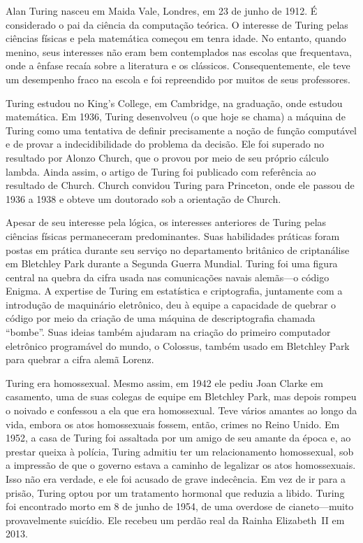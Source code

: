 \documentclass[../../../include/open-logic-section]{subfiles}
\begin{document}


Alan Turing nasceu em Maida Vale, Londres, em 23 de junho de 1912. É
considerado o pai da ciência da computação teórica. O interesse de Turing
pelas ciências físicas e pela matemática começou em tenra idade. No entanto,
quando menino, seus interesses não eram bem contemplados nas escolas que
frequentava, onde a ênfase recaía sobre a literatura e os
clássicos. Consequentemente, ele teve um desempenho fraco na escola e foi
repreendido por muitos de seus professores.


Turing estudou no King's College, em Cambridge, na graduação, onde
estudou matemática. Em 1936, Turing desenvolveu (o que hoje se chama)
a máquina de Turing como uma tentativa de definir precisamente a noção de
função computável e de provar a indecidibilidade do problema da decisão. Ele
foi superado no resultado por Alonzo Church, que o provou por meio de seu
próprio cálculo lambda. Ainda assim, o artigo de Turing foi publicado
com referência ao resultado de Church. Church convidou Turing para Princeton,
onde ele passou de 1936 a 1938 e obteve um doutorado sob a orientação de
Church.

Apesar de seu interesse pela lógica, os interesses anteriores de Turing pelas
ciências físicas permaneceram predominantes. Suas habilidades práticas foram
postas em prática durante seu serviço no departamento britânico de criptanálise
em Bletchley Park durante a Segunda Guerra Mundial. Turing foi uma figura
central na quebra da cifra usada nas comunicações navais alemãs---o código
Enigma. A expertise de Turing em estatística e criptografia, juntamente
com a introdução de maquinário eletrônico, deu à equipe a
capacidade de quebrar o código por meio da criação de uma máquina de
descriptografia chamada ``bombe''. Suas ideias também ajudaram na criação do
primeiro computador eletrônico programável do mundo, o Colossus, também usado
em Bletchley Park para quebrar a cifra alemã Lorenz.

Turing era homossexual. Mesmo assim, em 1942 ele pediu Joan Clarke em
casamento, uma de suas colegas de equipe em Bletchley Park, mas depois rompeu
o noivado e confessou a ela que era homossexual. Teve vários amantes
ao longo da vida, embora os atos homossexuais fossem, então, crimes no Reino
Unido. Em 1952, a casa de Turing foi assaltada por um amigo de seu amante da
época e, ao prestar queixa à polícia, Turing admitiu ter um relacionamento
homossexual, sob a impressão de que o governo estava a caminho de
legalizar os atos homossexuais. Isso não era verdade, e ele foi acusado de
grave indecência. Em vez de ir para a prisão, Turing optou por um tratamento
hormonal que reduzia a libido. Turing foi encontrado morto em 8 de junho de
1954, de uma overdose de cianeto---muito provavelmente suicídio. Ele recebeu
um perdão real da Rainha Elizabeth~II em 2013.
\end{document}
